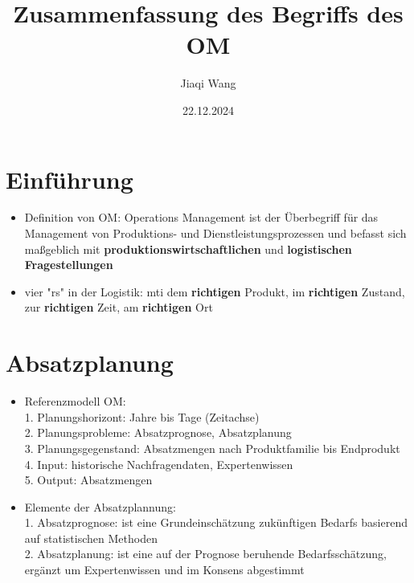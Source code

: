 \documentclass[12pt, letterpaper]{article}
\begin{document}
\begin{CJK*}{UTF8}{gbsn}%

\title{Zusammenfassung des Begriffs des OM}
\author{Jiaqi Wang} %
\date{22.12.2024} %
\maketitle %

\vspace{5cm}

\section{Einführung} %
\begin{itemize}
\item Definition von OM: Operations Management ist der Überbegriff für das Management von Produktions- und Dienstleistungsprozessen und
befasst sich maßgeblich mit \textbf{produktionswirtschaftlichen} und \textbf{logistischen Fragestellungen}

\item vier "rs" in der Logistik: mti dem \textbf{richtigen} Produkt, im \textbf{richtigen} Zustand, zur \textbf{richtigen} Zeit, am \textbf{richtigen} Ort

\end{itemize}


\newpage
{}%

\section{Absatzplanung}

\begin{itemize}
\item Referenzmodell OM:\\
1. Planungshorizont: Jahre bis Tage (Zeitachse)\\
2. Planungsprobleme: Absatzprognose, Absatzplanung\\
3. Planungsgegenstand: Absatzmengen nach Produktfamilie bis Endprodukt\\
4. Input: historische Nachfragendaten, Expertenwissen\\
5. Output: Absatzmengen

\item Elemente der Absatzplannung:\\
1. Absatzprognose: ist eine Grundeinschätzung zukünftigen Bedarfs basierend
auf statistischen Methoden\\
2. Absatzplanung: ist eine auf der Prognose beruhende Bedarfsschätzung,
ergänzt um Expertenwissen und im Konsens abgestimmt\\


\end{itemize}
\end{CJK*}
\end{document}
